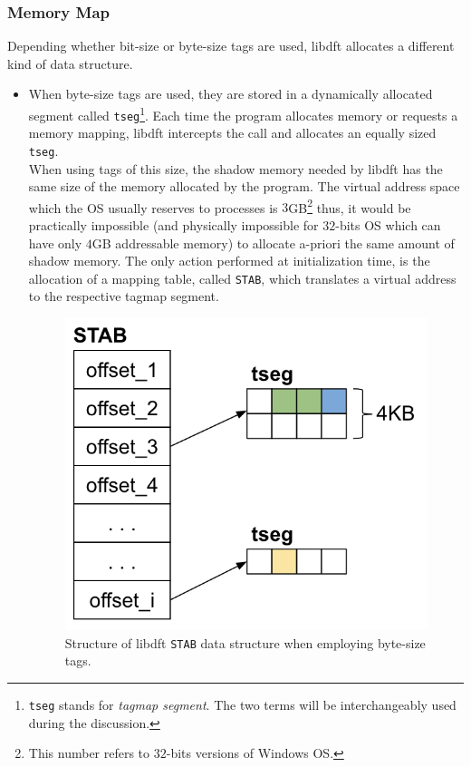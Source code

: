 \documentclass[LaM,binding=0.6cm]{sapthesis}
\begin{document}
\subsubsection{Memory Map}
\label{subsubsec:memorymap}
Depending whether bit-size or byte-size tags are used, libdft allocates a different kind of data structure.
\begin{itemize}
\item When byte-size tags are used, they are stored in a dynamically allocated segment called \texttt{tseg}\footnote{\texttt{tseg} stands for \textit{tagmap segment}. The two terms will be interchangeably used during the discussion.}. Each time the program allocates memory or requests a memory mapping, libdft intercepts the call and allocates an equally sized \texttt{tseg}.\\
When using tags of this size, the shadow memory needed by libdft has the same size of the memory allocated by the program. The virtual address space which the OS usually reserves to processes is $3$GB\footnote{This number refers to $32$-bits versions of Windows OS\cite{VirtualA15:online}.} thus, it would be practically impossible (and physically impossible for $32$-bits OS which can have only $4$GB addressable memory) to allocate a-priori the same amount of shadow memory. The only action performed at initialization time, is the allocation of a mapping table, called \texttt{STAB}, which translates a virtual address to the respective tagmap segment.

\begin{figure}[h!]
\centering
\includegraphics[scale=.7]{images/techn10}
\caption{Structure of libdft \texttt{STAB} data structure when employing byte-size tags.}
\end{figure}


\end{itemize}
\end{document}
